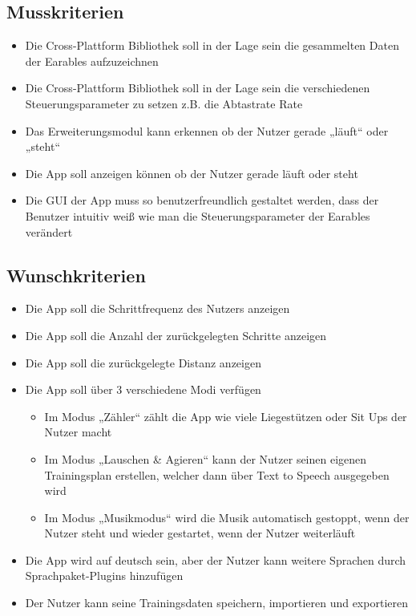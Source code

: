 \documentclass[a4paper,12pt]{article}
\begin{document}
\subsection{Musskriterien}

  \begin{itemize}
    \item\text Die Cross-Plattform Bibliothek soll in der Lage sein die gesammelten Daten der Earables aufzuzeichnen
    \item\text Die Cross-Plattform Bibliothek soll in der Lage sein die verschiedenen Steuerungsparameter zu setzen z.B. die Abtastrate Rate
    \item\text Das Erweiterungsmodul kann erkennen ob der Nutzer gerade „läuft“ oder „steht“
    \item\text Die App soll anzeigen können ob der Nutzer gerade läuft oder steht
    \item\text Die GUI der App muss so benutzerfreundlich gestaltet werden, dass der Benutzer intuitiv weiß wie man die Steuerungsparameter der Earables verändert
  \end{itemize}
\subsection{Wunschkriterien}
  \begin{itemize}
    \item\text Die App soll die Schrittfrequenz des Nutzers anzeigen
    \item\text Die App soll die Anzahl der zurückgelegten Schritte anzeigen
    \item\text Die App soll die zurückgelegte Distanz anzeigen
    \item\text Die App soll über 3 verschiedene Modi verfügen
      \begin{itemize}
        \item\text Im Modus „Zähler“  zählt die App wie viele Liegestützen oder Sit Ups der Nutzer macht
        \item\text  Im Modus „Lauschen \& Agieren“ kann der Nutzer seinen eigenen Trainingsplan erstellen, welcher dann über Text to Speech ausgegeben wird
        \item\text  Im Modus „Musikmodus“ wird die Musik automatisch gestoppt, wenn der Nutzer steht und wieder gestartet, wenn der Nutzer weiterläuft
      \end{itemize}
    \item\text Die App wird auf deutsch sein, aber der Nutzer kann weitere Sprachen durch Sprachpaket-Plugins hinzufügen
    \item\text Der Nutzer kann seine Trainingsdaten speichern, importieren und exportieren
  \end{itemize}
\end{document}
